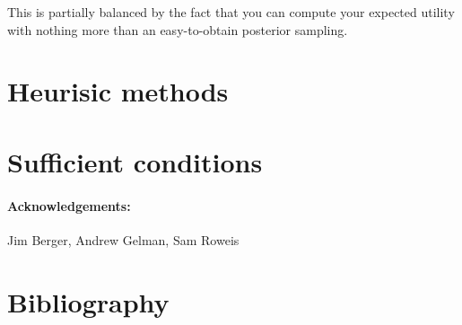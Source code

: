 \documentclass[12pt]{article}
\begin{document}
This is partially balanced by the fact that you can compute your expected utility with
  nothing more than an easy-to-obtain posterior sampling.

\section{Heurisic methods}

\section{Sufficient conditions}


\paragraph{Acknowledgements:}
Jim Berger,
Andrew Gelman,
Sam Roweis

\section*{Bibliography}
\end{document}
